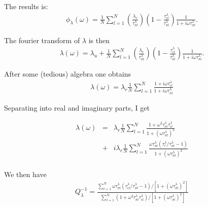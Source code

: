 \documentclass[11pt]{article}
\begin{document}
The results is:
\begin{eqnarray}
\phi_{\lambda}(\omega)=  \frac{1}{N}\sum_{l=1}^N\left(\frac{\lambda_r}{\tau^{\lambda}_{\sigma l}}\right) 
            \left(1-\frac{\tau^{\lambda}_{\epsilon l}}{\tau^{\lambda}_{\sigma l}} \right)\frac{1}{1+i\omega\tau^{\lambda}_{\sigma l}}.
\end{eqnarray}

The fourier transform of $\lambda$ is then
\begin{eqnarray}
\lambda(\omega) = \lambda_u 
+\frac{1}{N}\sum_{l=1}^N\left(\frac{\lambda_r}{\tau^{\lambda}_{\sigma l}}\right) 
            \left(1-\frac{\tau^{\lambda}_{\epsilon l}}{\tau^{\lambda}_{\sigma l}} \right)\frac{1}{1+i\omega\tau^{\lambda}_{\sigma l}}.
\end{eqnarray}

After some (tedious) algebra one obtains
\begin{eqnarray}
\lambda(\omega) = \lambda_r \frac{1}{N}\sum_{l=1}^N\frac{1+i\omega\tau^{\lambda}_{\epsilon l}}{1+i\omega\tau^{\lambda}_{\sigma l}} 
\end{eqnarray}

Separating into real and imaginary parts, I get

\begin{eqnarray}
\lambda(\omega) & = & \lambda_r 
\frac{1}{N}\sum_{l=1}^N
\frac{1+\omega^2\tau^{\lambda}_{\sigma l}\tau^{\lambda}_{\epsilon l}}
     {1+(\omega\tau^{\lambda}_{\sigma l})^2}  \\\nonumber
                & + & i\lambda_r \frac{1}{N}\sum_{l=1}^N\frac{\omega\tau^{\lambda}_{\sigma l}(\tau^{\lambda}_{\epsilon}/\tau^{\lambda}_{\sigma l}-1)}
                                                              {1+(\omega\tau^{\lambda}_{\sigma l})^2}  \nonumber\\
\end{eqnarray}

We then have
\begin{eqnarray}
Q^{-1}_{\lambda} = \frac{\sum_{l=1}^N {\omega\tau^{\lambda}_{\sigma l}\left(\tau^{\lambda}_{\epsilon l}/\tau^{\lambda}_{\sigma l} -1\right)}
                                           /\left[1 + (\omega\tau^{\lambda}_{\sigma l})^2\right] 
                        }
                        {\sum_{l=1}^N (1 + \omega^2\tau^{\lambda}_{\sigma l}\tau^{\lambda}_{\epsilon l})
                                           /\left[1 + (\omega\tau^{\lambda}_{\sigma l})^2\right]       
                        }
\end{eqnarray}
\end{document}
